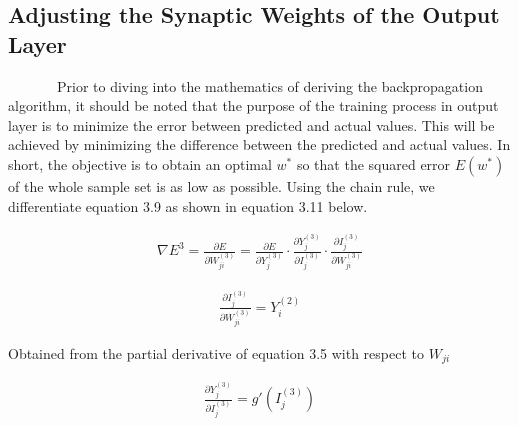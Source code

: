 \documentclass[
  12pt,
]{report}
\begin{document}
\subsection{Adjusting the Synaptic Weights of the Output
Layer}\label{adjusting-the-synaptic-weights-of-the-output-layer}

~~~~~~~Prior to diving into the mathematics of deriving the
backpropagation algorithm, it should be noted that the purpose of the
training process in output layer is to minimize the error between
predicted and actual values. This will be achieved by minimizing the
difference between the predicted and actual values. In short, the
objective is to obtain an optimal \(w^*\) so that the squared error
\({E(w^*)}\) of the whole sample set is as low as possible. Using the
chain rule, we differentiate equation 3.9 as shown in equation 3.11
below.

\vspace{-1em}

\begin{equation}
\begin{aligned}
\nabla E^3 = \frac{\partial E}{\partial W_{ji}^{(3)}} = \frac{\partial E}{\partial Y_j^{(3)}} \cdot \frac{\partial Y_j^{(3)}}{\partial I_j^{(3)}} \cdot \frac{\partial I_j^{(3)}}{\partial W_{ji}^{(3)}}
\label{eq:equation 3.11}
\end{aligned}
\end{equation} \vspace{-1em}

\vspace{-1em}

\begin{equation}
\begin{aligned}
\frac{\partial I_j^{(3)}}{\partial W_{ji}^{(3)}} = Y_i^{(2)} 
\label{eq:equation 3.12}
\end{aligned}
\end{equation} \vspace{-1em}

Obtained from the partial derivative of equation 3.5 with respect to
\(W_{ji}\)

\vspace{-1em}

\begin{equation}
\begin{aligned}
\frac{\partial Y_j^{(3)}}{\partial I_j^{(3)}} = g'(I_j^{(3)})
\label{eq:equation 3.13}
\end{aligned}
\end{equation} \vspace{-1em}
\end{document}
